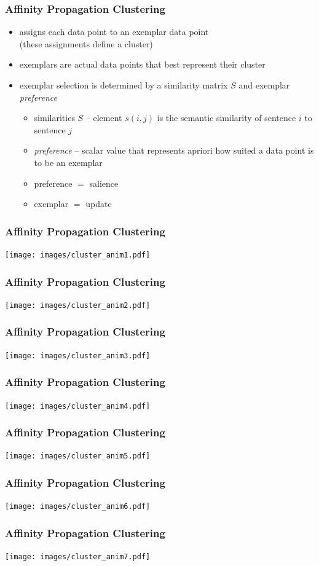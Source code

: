 \documentclass{beamer}
\begin{document}
\begin{frame}
\frametitle{Affinity Propagation Clustering}
\begin{itemize}
\pause
\item assigns each data point to an exemplar data point \\
     (these assignments
      define a cluster)
\pause
\item exemplars are actual data points that best represent their cluster
\pause
\item exemplar selection is determined by a similarity matrix $S$ and 
      exemplar \textit{preference}
\pause
\begin{itemize}
\pause 
\item similarities $S$ -- element $s(i,j)$ is the semantic similarity of sentence $i$ to sentence $j$
\pause
\item \textit{preference} -- scalar value that represents 
      apriori how suited a data point is to be an exemplar
\pause
\item \alert<+->{preference $=$ salience}
\pause
\item \alert<+->{exemplar $=$ update}
\end{itemize}

\end{itemize}


\end{frame}



\begin{frame}
\frametitle{Affinity Propagation Clustering}
    \texttt{[image: images/cluster\_anim1.pdf]}
\end{frame}
\begin{frame}
\frametitle{Affinity Propagation Clustering}
    \texttt{[image: images/cluster\_anim2.pdf]}
\end{frame}
\begin{frame}
\frametitle{Affinity Propagation Clustering}
    \texttt{[image: images/cluster\_anim3.pdf]}
\end{frame}
\begin{frame}
\frametitle{Affinity Propagation Clustering}
    \texttt{[image: images/cluster\_anim4.pdf]}
\end{frame}
\begin{frame}
\frametitle{Affinity Propagation Clustering}
    \texttt{[image: images/cluster\_anim5.pdf]}
\end{frame}
\begin{frame}
\frametitle{Affinity Propagation Clustering}
    \texttt{[image: images/cluster\_anim6.pdf]}
\end{frame}
\begin{frame}
\frametitle{Affinity Propagation Clustering}
    \texttt{[image: images/cluster\_anim7.pdf]}
\end{frame}
\end{document}
